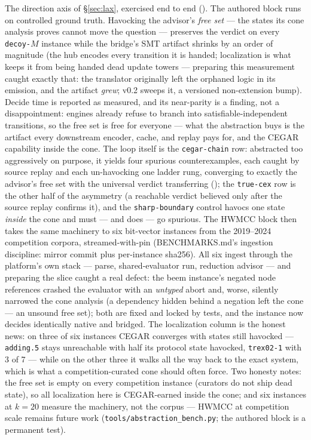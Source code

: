 The direction axis of \S\ref{sec:lax}, exercised end to end
(). The authored block runs on controlled ground
truth. Havocking the advisor's \emph{free set} --- the states its cone
analysis proves cannot move the question --- preserves the verdict on
every \texttt{decoy-$M$} instance while the bridge's SMT artifact
shrinks by an order of magnitude (the hub encodes every transition it
is handed; localization is what keeps it from being handed dead
update towers --- preparing this measurement caught exactly that: the
translator originally left the orphaned logic in its emission, and the
artifact \emph{grew}; v0.2 sweeps it, a versioned non-extension bump).
Decide time is reported as measured, and its near-parity is a finding,
not a disappointment: engines already refuse to branch into
satisfiable-independent transitions, so the free set is free for
everyone --- what the abstraction buys is the artifact every
downstream encoder, cache, and replay pays for, and the CEGAR
capability inside the cone. The loop itself is the
\texttt{cegar-chain} row: abstracted too aggressively on purpose, it
yields four spurious counterexamples, each caught by source replay
and each un-havocking one ladder rung, converging to exactly the
advisor's free set with the universal verdict transferring
(); the \texttt{true-cex} row is the other half of the
asymmetry (a reachable verdict believed only after the source replay
confirms it), and the \texttt{sharp-boundary} control havocs one state
\emph{inside} the cone and must --- and does --- go spurious. The
HWMCC block then takes the same machinery to six bit-vector instances
from the 2019--2024 competition corpora, streamed-with-pin
(BENCHMARKS.md's ingestion discipline: mirror commit plus per-instance
sha256). All six ingest through the platform's own stack --- parse,
shared-evaluator run, reduction advisor --- and preparing the slice
caught a real defect: the beem instance's negated node references
crashed the evaluator with an \emph{untyped} abort and, worse,
silently narrowed the cone analysis (a dependency hidden behind a
negation left the cone --- an unsound free set); both are fixed and
locked by tests, and the instance now decides identically native and
bridged. The localization column is the honest news: on three of six
instances CEGAR converges with states still havocked ---
\texttt{adding.5} stays unreachable with half its protocol state
havocked, \texttt{trex02-1} with 3 of 7 --- while on the other three
it walks all the way back to the exact system, which is what a
competition-curated cone should often force. Two honesty notes: the
free set is empty on every competition instance (curators do not ship
dead state), so all localization here is CEGAR-earned inside the
cone; and six instances at $k{=}20$ measure the machinery, not the
corpus --- HWMCC at competition scale remains future work
(\texttt{tools/abstraction\_bench.py}; the authored block is a
permanent test).

